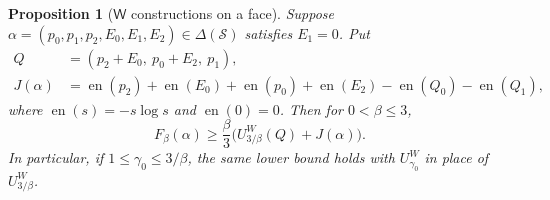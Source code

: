 \documentclass[11pt]{article}
\numberwithin{equation}{section}
\newtheorem{proposition}[theorem]{Proposition}
\theoremstyle{definition}
\theoremstyle{remark}
\begin{document}
\begin{proposition}[$\mathsf W$ constructions on a face]
\label{prop:face}
Suppose $\alpha=(p_0,p_1,p_2,E_0,E_1,E_2)\in\Delta(\mathcal S)$ satisfies
$E_1=0$.  Put
\begin{align}
 Q&=(p_2+E_0,\ p_0+E_2,\ p_1),\label{val:face-Q}\\
 J(\alpha)&=\operatorname{en}(p_2)+\operatorname{en}(E_0)+\operatorname{en}(p_0)+\operatorname{en}(E_2)
                  -\operatorname{en}(Q_0)-\operatorname{en}(Q_1),\label{val:face-J}
\end{align}
where $\operatorname{en}(s)=-s\log s$ and $\operatorname{en}(0)=0$.  Then for $0<\beta\le3$,
\begin{equation}
 F_\beta(\alpha)\ge
 \frac\beta3\bigl(U^W_{3/\beta}(Q)+J(\alpha)\bigr).
\label{val:face-bound}
\end{equation}
In particular, if $1\le\gamma_0\le3/\beta$, the same lower bound holds
with $U^W_{\gamma_0}$ in place of $U^W_{3/\beta}$.
\end{proposition}
\end{document}
